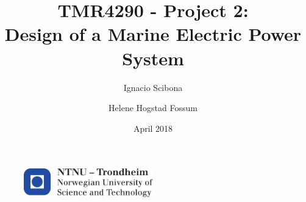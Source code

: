 \documentclass{article}
\author{Ignacio Scibona \and Helene Hogstad Fossum}
\date{April 2018}
\title{TMR4290 - Project 2: \\ Design of a Marine Electric Power System}
\begin{document}
\begin{titlepage} 
    \maketitle
    \thispagestyle{empty}
    \begin{figure}
    \centering
    \includegraphics[width=0.5\textwidth]{utils/logontnu_eng.pdf}
    \end{figure}
    
\end{titlepage}



\setcounter{page}{1}
\newpage








%

\newpage
\thispagestyle{empty}




\newpage
{}
\setcounter{page}{1}

\end{document}
